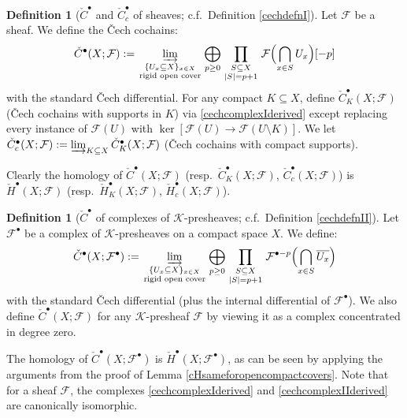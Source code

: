 \documentclass[12pt]{article}
\theoremstyle{definition}
\newtheorem{definition}[theorem]{Definition}
\theoremstyle{remark}
\numberwithin{equation}{subsection}
\newcommand{\F}{\mathcal F}
\newcommand{\K}{\mathcal K}
\newcommand{\cH}{\check H}
\newcommand{\cC}{\check C}
\begin{document}
\begin{definition}[$\cC^\bullet$ and $\cC^\bullet_c$ of sheaves; c.f.\ Definition \ref{cechdefnI}]
Let $\F$ be a sheaf.  We define the \v Cech cochains:
\begin{equation}\label{cechcomplexIderived}
\cC^\bullet(X;\F):=\varinjlim_{\begin{smallmatrix}\{U_x\subseteq X\}_{x\in X}\cr\text{rigid open cover}\end{smallmatrix}}\bigoplus_{p\geq 0}\prod_{\begin{smallmatrix}S\subseteq X\cr\left|S\right|=p+1\end{smallmatrix}}\F\Bigl(\bigcap_{x\in S}U_x\Bigr)[-p]
\end{equation}
with the standard \v Cech differential.  For any compact $K\subseteq X$, define $\cC^\bullet_K(X;\F)$ (\v Cech cochains with supports in $K$) via \eqref{cechcomplexIderived} except replacing every instance of $\F(U)$ with $\ker[\F(U)\to\F(U\setminus K)]$.  We let $\cC^\bullet_c(X;\F):=\varinjlim_{K\subseteq X}\cC^\bullet_K(X;\F)$ (\v Cech cochains with compact supports).

Clearly the homology of $\cC^\bullet(X;\F)$ (resp.\ $\cC^\bullet_K(X;\F)$, $\cC^\bullet_c(X;\F)$) is $\cH^\bullet(X;\F)$ (resp.\ $\cH^\bullet_K(X;\F)$, $\cH^\bullet_c(X;\F)$).
\end{definition}

\begin{definition}[$\cC^\bullet$ of complexes of $\K$-presheaves; c.f.\ Definition \ref{cechdefnII}]
Let $\F^\bullet$ be a complex of $\K$-presheaves on a compact space $X$.  We define:
\begin{equation}\label{cechcomplexIIderived}
\cC^\bullet(X;\F^\bullet):=\varinjlim_{\begin{smallmatrix}\{U_x\subseteq X\}_{x\in X}\cr\text{rigid open cover}\end{smallmatrix}}\bigoplus_{p\geq 0}\prod_{\begin{smallmatrix}S\subseteq X\cr\left|S\right|=p+1\end{smallmatrix}}\F^{\bullet-p}\Bigl(\bigcap_{x\in S}\overline{U_x}\Bigr)
\end{equation}
with the standard \v Cech differential (plus the internal differential of $\F^\bullet$).  We also define $\cC^\bullet(X;\F)$ for any $\K$-presheaf $\F$ by viewing it as a complex concentrated in degree zero.

The homology of $\cC^\bullet(X;\F^\bullet)$ is $\cH^\bullet(X;\F^\bullet)$, as can be seen by applying the arguments from the proof of Lemma \ref{cHsameforopencompactcovers}.  Note that for a sheaf $\F$, the complexes \eqref{cechcomplexIderived} and \eqref{cechcomplexIIderived} are canonically isomorphic.
\end{definition}
\end{document}
